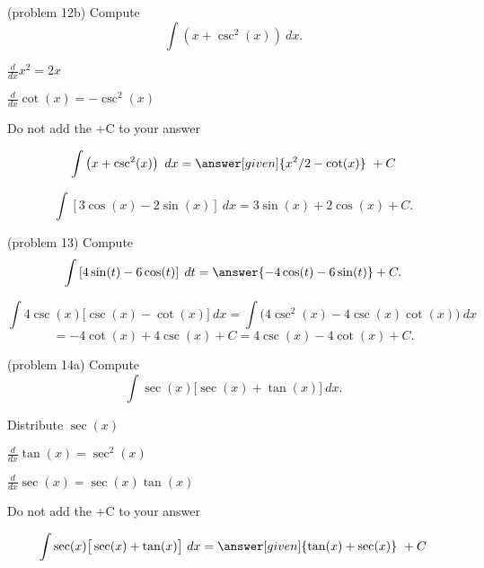 \documentclass{ximera}
\begin{document}
\begin{problem}(problem 12b)
Compute
\[
\int \left(x + \csc^2(x) \right) \ dx.
\]

\begin{hint}
$\frac{d}{dx} x^2 = 2x$
\end{hint}
\begin{hint}
$\frac{d}{dx} \cot(x) = -\csc^2(x)$
\end{hint}
\begin{hint}
\begin{center}
Do not add the +C to your answer
\end{center}
\end{hint}

\[
\int \left(x + \csc^2(x) \right) \ dx =
\answer[given]{x^2 /2 - \cot(x)} \ +  C
\]
\end{problem}



\begin{example}[example 13]
\[
\int \left[3\cos(x) - 2\sin(x)\right] \ dx = 3\sin(x) + 2\cos(x) + C.
\]
\end{example}


\begin{problem}(problem 13)
Compute
\[
\int \left[4\sin(t) - 6\cos(t)\right] \; dt = \answer{-4\cos(t) - 6\sin(t)} + C.
\]
\end{problem}

\begin{example}[example 14]
\[
\int 4\csc(x)\big[\csc(x) - \cot(x)\big] \ dx = \int \big(4\csc^2(x)  - 4\csc(x)\cot(x)\big) \ dx
\]
\[
 = -4\cot(x) + 4\csc(x) + C
= 4\csc(x) - 4 \cot(x) + C.
\]
\end{example}



\begin{problem}(problem 14a)
Compute
\[
\int \sec(x)\big[\sec(x) + \tan(x) \big] \ dx.
\]

\begin{hint}
Distribute $\sec(x)$
\end{hint}
\begin{hint}
$\frac{d}{dx} \tan(x) = \sec^2(x)$
\end{hint}
\begin{hint}
$\frac{d}{dx} \sec(x) = \sec(x)\tan(x)$
\end{hint}
\begin{hint}
\begin{center}
Do not add the +C to your answer
\end{center}
\end{hint}

\[
\int \sec(x)\big[\sec(x) + \tan(x) \big] \ dx =
\answer[given]{\tan(x) + \sec(x)} \ +  C
\]
\end{problem}
\end{document}
